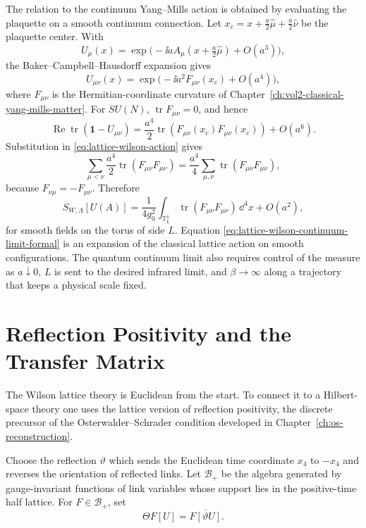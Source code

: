 The relation to the continuum Yang--Mills action is obtained by evaluating the
plaquette on a smooth continuum connection.  Let
\(x_c=x+\frac a2\widehat\mu+\frac a2\widehat\nu\) be the plaquette center.
With
\[
  U_\mu(x)
  =
  \exp\bigl(-\ii a A_\mu(x+\tfrac a2\widehat\mu)+O(a^3)\bigr),
\]
the Baker--Campbell--Hausdorff expansion gives
\begin{equation}
  U_{\mu\nu}(x)
  =
  \exp\bigl(-\ii a^2 F_{\mu\nu}(x_c)+O(a^4)\bigr),
  \label{eq:lattice-plaquette-continuum-expansion}
\end{equation}
where \(F_{\mu\nu}\) is the Hermitian-coordinate curvature of
Chapter~\ref{ch:vol2-classical-yang-mills-matter}.  For \(SU(N)\),
\(\operatorname{tr}F_{\mu\nu}=0\), and hence
\[
  \operatorname{Re}\operatorname{tr}(\mathbf 1-U_{\mu\nu})
  =
  \frac{a^4}{2}\operatorname{tr}(F_{\mu\nu}(x_c)F_{\mu\nu}(x_c))
  +O(a^6).
\]
Substitution in \eqref{eq:lattice-wilson-action} gives
\[
  \sum_{\mu<\nu}\frac{a^4}{2}\operatorname{tr}(F_{\mu\nu}F_{\mu\nu})
  =
  \frac{a^4}{4}
  \sum_{\mu,\nu}\operatorname{tr}(F_{\mu\nu}F_{\mu\nu}),
\]
because \(F_{\nu\mu}=-F_{\mu\nu}\).  Therefore
\begin{equation}
  S_{W,\Lambda}[U(A)]
  =
  \frac{1}{4g_0^2}
  \int_{\mathbb T_L^4}
  \operatorname{tr}(F_{\mu\nu}F_{\mu\nu})\,\dd^4x
  +O(a^2),
  \label{eq:lattice-wilson-continuum-limit-formal}
\end{equation}
for smooth fields on the torus of side \(L\).  Equation
\eqref{eq:lattice-wilson-continuum-limit-formal} is an expansion of the
classical lattice action on smooth configurations.  The quantum continuum
limit also requires control of the measure as \(a\downarrow0\), \(L\) is sent
to the desired infrared limit, and \(\beta\to\infty\) along a trajectory that
keeps a physical scale fixed.

\section{Reflection Positivity and the Transfer Matrix}

The Wilson lattice theory is Euclidean from the start.  To connect it to a
Hilbert-space theory one uses the lattice version of reflection positivity,
the discrete precursor of the Osterwalder--Schrader condition developed in
Chapter~\ref{ch:os-reconstruction}.

Choose the reflection \(\vartheta\) which sends the Euclidean time coordinate
\(x_4\) to \(-x_4\) and reverses the orientation of reflected links.  Let
\(\mathcal B_+\) be the algebra generated by gauge-invariant functions of link
variables whose support lies in the positive-time half lattice.  For
\(F\in\mathcal B_+\), set
\[
  \Theta F[U]=\overline{F[\vartheta U]}.
\]

